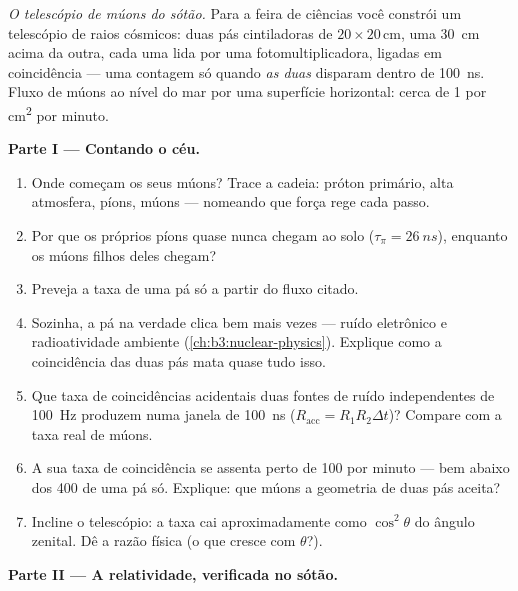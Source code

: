 \begin{problem}\label{pb:b3:particle-physics:1}
\emph{O telescópio de múons do sótão.} Para a feira de ciências você
constrói um telescópio de raios cósmicos: duas pás cintiladoras de
$20\times20$\,\unit{cm}, uma \qty{30}{cm} acima da outra, cada uma lida
por uma fotomultiplicadora, ligadas em coincidência --- uma contagem só
quando \emph{as duas} disparam dentro de \qty{100}{ns}. Fluxo de múons ao
nível do mar por uma superfície horizontal: cerca de 1 por \unit{cm^2}
por minuto.

\medskip\noindent\textbf{Parte I --- Contando o céu.}

\begin{enumerate}
  \item Onde começam os seus múons? Trace a cadeia: próton
        primário, alta atmosfera, píons, múons --- nomeando que
        força rege cada passo.
  \item Por que os próprios píons quase nunca chegam ao
        solo ($\tau_\pi = \qty{26}{ns}$), enquanto os múons
        filhos deles chegam?
  \item Preveja a taxa de uma pá só a partir do fluxo citado.
  \item Sozinha, a pá na verdade clica bem mais vezes ---
        ruído eletrônico e radioatividade ambiente
        (\cref{ch:b3:nuclear-physics}). Explique como a
        coincidência das duas pás mata quase tudo isso.
  \item Que taxa de coincidências acidentais duas fontes de ruído
        independentes de \qty{100}{Hz} produzem numa janela de
        \qty{100}{ns} ($R_{\text{acc}} = R_1R_2\Delta t$)? Compare com
        a taxa real de múons.
  \item A sua taxa de coincidência se assenta perto de 100 por minuto ---
        bem abaixo dos 400 de uma pá só. Explique: que múons
        a geometria de duas pás aceita?
  \item Incline o telescópio: a taxa cai aproximadamente como
        $\cos^2\theta$ do ângulo zenital. Dê a razão física
        (o que cresce com $\theta$?).
\end{enumerate}

\medskip\noindent\textbf{Parte II --- A relatividade, verificada no sótão.}


\end{problem}
